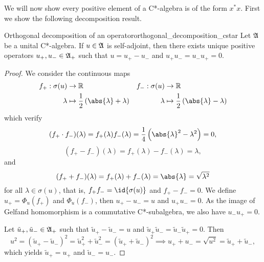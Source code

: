 We will now show every positive element of a C*-algebra is of the form \(x^*x\). First we show the following decomposition result.
\begin{lemma}{Orthogonal decomposition of an operator}{orthogonal_decomposition_cstar}
    Let \(\mathfrak{A}\) be a unital C*-algebra. If \(u \in \mathfrak{A}\) is self-adjoint, then there exists unique positive operators \(u_+, u_- \in \mathfrak{A}_+\) such that \(u = u_+ - u_-\) and \(u_+u_- = u_-u_+ = 0\).
\end{lemma}
\begin{proof}
    We consider the continuous maps
    \begin{align*}
        f_+ : \sigma(u) &\to \mathbb{R}&
        f_- : \sigma(u) &\to \mathbb{R}\\
                \lambda &\mapsto \frac12\left(\abs{\lambda} + \lambda\right)&
                \lambda &\mapsto \frac12\left(\abs{\lambda} - \lambda\right)
    \end{align*}
    which verify
    \begin{equation*}
        (f_+\cdot f_-)(\lambda) = f_+(\lambda)f_-(\lambda) = \frac14 \left(\abs{\lambda}^2 - \lambda^2\right) = 0,
    \end{equation*}
    \begin{equation*}
        (f_+ - f_-)(\lambda) = f_+(\lambda) - f_-(\lambda) = \lambda,
    \end{equation*}
    and
    \begin{equation*}
        (f_+ + f_-)(\lambda) = f_+(\lambda) + f_-(\lambda) = \abs{\lambda} = \sqrt{\lambda^2}
    \end{equation*}
    for all \(\lambda \in \sigma(u)\), that is, \(f_+ f_- = \id{\sigma(u)}\) and \(f_+ - f_- = 0\). We define \(u_+ = \Phi_u(f_+)\) and \(\Phi_u(f_-)\), then \(u_+ - u_- = u\) and \(u_+ u_- = 0\). As the image of Gelfand homomorphism is a commutative C*-subalgebra, we also have \(u_- u_+ = 0\).

    Let \(\tilde{u}_+, \tilde{u}_- \in \mathfrak{A}_+\) such that \(\tilde{u}_+ - \tilde{u}_- = u\) and \(\tilde{u}_+\tilde{u}_- = \tilde{u}_-\tilde{u}_+ = 0\). Then
    \begin{equation*}
        u^2 = \left(\tilde{u}_+ - \tilde{u}_-\right)^2 = \tilde{u}_+^2 + \tilde{u}_-^2 = \left(\tilde{u}_+ + \tilde{u}_-\right)^2 \implies u_+ + u_- = \sqrt{u^2} = \tilde{u}_+ + \tilde{u}_-,
    \end{equation*}
    which yields \(\tilde{u}_+ = u_+\) and \(\tilde{u}_- = u_-\).
\end{proof}

